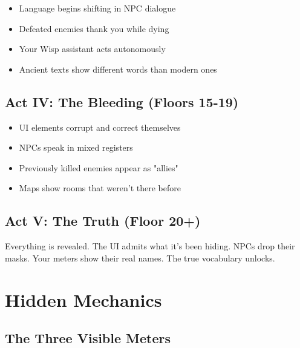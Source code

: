 \documentclass[11pt,a4paper,twoside]{book}
\begin{document}
\begin{itemize}
    \item Language begins shifting in NPC dialogue
    \item Defeated enemies thank you while dying
    \item Your Wisp assistant acts autonomously
    \item Ancient texts show different words than modern ones
\end{itemize}

\subsection{Act IV: The Bleeding (Floors 15-19)}

\begin{itemize}
    \item UI elements corrupt and correct themselves
    \item NPCs speak in mixed registers
    \item Previously killed enemies appear as "allies"
    \item Maps show rooms that weren't there before
\end{itemize}

\subsection{Act V: The Truth (Floor 20+)}

Everything is revealed. The UI admits what it's been hiding. NPCs drop their masks. Your meters show their real names. The true vocabulary unlocks.

\section{Hidden Mechanics}

\subsection{The Three Visible Meters}
\end{document}
